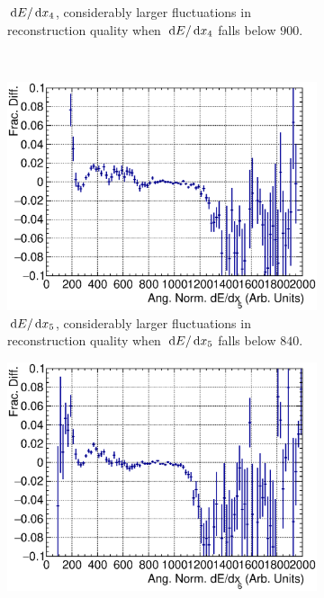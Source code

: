 \begin{figure}[!htb]
\begin{subfigure}{\dbfigwid\textwidth}
           \caption{$\,\textrm{d}E/\,\textrm{d}x_4$, considerably larger fluctuations in reconstruction quality when $\,\textrm{d}E/\,\textrm{d}x_4$ falls below $900$.}
           \label{subfig:dedx3}
      \end{subfigure}
      \\
      \begin{subfigure}[!htb]{\dbfigwid\textwidth}
           \includegraphics[width=\textwidth]{figures/sel/fig53e.eps}
           \caption{$\,\textrm{d}E/\,\textrm{d}x_5$, considerably larger fluctuations in reconstruction quality when $\,\textrm{d}E/\,\textrm{d}x_5$ falls below $840$.}
           \label{subfig:dedx4}
      \end{subfigure}
      \begin{subfigure}[!htb]{\dbfigwid\textwidth}
           \includegraphics[width=\textwidth]{figures/sel/fig53f.eps}

\end{subfigure}
\end{figure}
